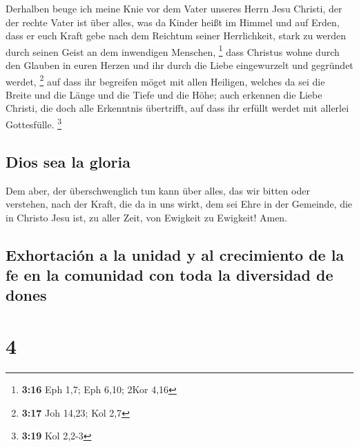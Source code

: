 Derhalben beuge ich meine Knie vor dem Vater unseres
Herrn Jesu Christi,  der der rechte Vater ist über alles,
was da Kinder heißt im Himmel und auf Erden,  dass er
euch Kraft gebe nach dem Reichtum seiner Herrlichkeit, stark zu werden
durch seinen Geist an dem inwendigen Menschen, \footnote{\textbf{3:16}
  Eph 1,7; Eph 6,10; 2Kor 4,16}  dass Christus wohne
durch den Glauben in euren Herzen und ihr durch die Liebe eingewurzelt
und gegründet werdet, \footnote{\textbf{3:17} Joh 14,23; Kol 2,7}
 auf dass ihr begreifen möget mit allen Heiligen, welches
da sei die Breite und die Länge und die Tiefe und die Höhe;
 auch erkennen die Liebe Christi, die doch alle
Erkenntnis übertrifft, auf dass ihr erfüllt werdet mit allerlei
Gottesfülle. \footnote{\textbf{3:19} Kol 2,2-3}

\hypertarget{dios-sea-la-gloria}{%
\subsection{Dios sea la gloria}\label{dios-sea-la-gloria}}

 Dem aber, der überschwenglich tun kann über alles, das
wir bitten oder verstehen, nach der Kraft, die da in uns wirkt,
 dem sei Ehre in der Gemeinde, die in Christo Jesu ist,
zu aller Zeit, von Ewigkeit zu Ewigkeit! Amen.

\hypertarget{exhortaciuxf3n-a-la-unidad-y-al-crecimiento-de-la-fe-en-la-comunidad-con-toda-la-diversidad-de-dones}{%
\subsection{Exhortación a la unidad y al crecimiento de la fe en la
comunidad con toda la diversidad de
dones}\label{exhortaciuxf3n-a-la-unidad-y-al-crecimiento-de-la-fe-en-la-comunidad-con-toda-la-diversidad-de-dones}}

\hypertarget{section-3}{%
\section{4}\label{section-3}}


